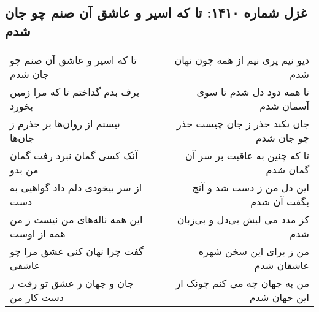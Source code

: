 \begin{center}
\section*{غزل شماره ۱۴۱۰: تا که اسیر و عاشق آن صنم چو جان شدم}
\label{sec:1410}
\begin{longtable}{l p{0.5cm} r}
تا که اسیر و عاشق آن صنم چو جان شدم
&&
دیو نیم پری نیم از همه چون نهان شدم
\\
برف بدم گداختم تا که مرا زمین بخورد
&&
تا همه دود دل شدم تا سوی آسمان شدم
\\
نیستم از روان‌ها بر حذرم ز جان‌ها
&&
جان نکند حذر ز جان چیست حذر چو جان شدم
\\
آنک کسی گمان نبرد رفت گمان من بدو
&&
تا که چنین به عاقبت بر سر آن گمان شدم
\\
از سر بیخودی دلم داد گواهیی به دست
&&
این دل من ز دست شد و آنچ بگفت آن شدم
\\
این همه ناله‌های من نیست ز من همه از اوست
&&
کز مدد می لبش بی‌دل و بی‌زبان شدم
\\
گفت چرا نهان کنی عشق مرا چو عاشقی
&&
من ز برای این سخن شهره عاشقان شدم
\\
جان و جهان ز عشق تو رفت ز دست کار من
&&
من به جهان چه می کنم چونک از این جهان شدم
\\
\end{longtable}
\end{center}
